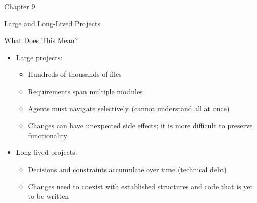 \documentclass[
ps,
]{prosper}
\begin{document}


\begin{slide}{Chapter 9}

\vspace*{2cm}

\begin{center}
\begin{Huge}
Large and Long-Lived Projects
\end{Huge}
\end{center}

\end{slide}



\begin{slide}{What Does This Mean?}

\begin{itemize}

\item Large projects:

  \begin{itemize}
    
  \item Hundreds of thousands of files

  \item Requirements span multiple modules

  \item Agents must navigate selectively (cannot understand all at once)

  \item Changes can have unexpected side effects; it is more difficult to
    preserve functionality
    
  \end{itemize}
  
\item Long-lived projects:

  \begin{itemize}
    
  \item Decisions and constraints accumulate over time (technical debt)

  \item Changes need to coexist with established structures and code that is
    yet to be written
    
  \end{itemize}
  
\end{itemize}
  
\end{slide}
\end{document}
